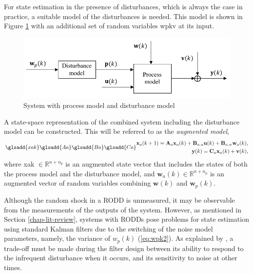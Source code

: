For state estimation in the presence of disturbances, which is always the case in practice, a suitable model of the disturbances is needed. This model is shown in Figure \ref{fig:model_diag_wpupwvy} with an additional set of random variables \gls{wpkv} at its input.
\begin{figure}[htp]
	\centering
	\includegraphics[width=12.5cm]{images/model_diag_wpupwvy.pdf}
	\caption{System with process model and disturbance model}
	\label{fig:model_diag_wpupwvy}
\end{figure}

A state-space representation of the combined system including the disturbance model can be constructed. This will be referred to as the \textit{augmented model},
\begin{equation} \label{eq:ss_rep_xa} \glsadd{xak} \glsadd{Aa} \glsadd{Ba} \glsadd{Ca}
	\begin{aligned}
		\mathbf{x}_a(k+1) = \mathbf{A}_a \mathbf{x}_a(k) + \mathbf{B}_{a,u} \mathbf{u}(k) + \mathbf{B}_{a,w} \mathbf{w}_{a}(k), \\
		\mathbf{y}(k) = \mathbf{C}_a \mathbf{x}_a(k) + \mathbf{v}(k),
	\end{aligned}
\end{equation}
where \gls{xak} $\in \mathbb{R}^{n+n_p}$ is an augmented state vector that includes the states of both the process model and the disturbance model, and $\mathbf{w}_a(k) \in \mathbb{R}^{n+n_p}$ is an augmented vector of random variables combining $\mathbf{w}(k)$ and $\mathbf{w}_p(k)$.

Although the random shock in a RODD is unmeasured, it may be observable from the measurements of the outputs of the system. However, as mentioned in Section \ref{chap-lit-review}, systems with RODDs pose problems for state estimation using standard Kalman filters due to the switching of the noise model parameters, namely, the variance of $w_p(k)$ (\ref{eq:wpk2}). As explained by \cite{andersson_adaptive_1985}, a trade-off must be made during the filter design between its ability to respond to the infrequent disturbance when it occurs, and its sensitivity to noise at other times.


